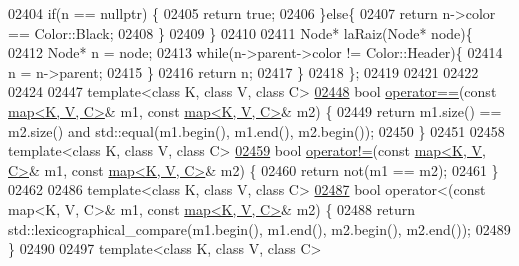 \begin{DoxyCode}
02404         \textcolor{keywordflow}{if}(n == \textcolor{keyword}{nullptr}) \{
02405             \textcolor{keywordflow}{return} \textcolor{keyword}{true};
02406         \}\textcolor{keywordflow}{else}\{
02407             \textcolor{keywordflow}{return} n->color == Color::Black;
02408         \}
02409     \}
02410 
02411     Node* laRaiz(Node* node)\{
02412         Node* n = node;
02413         \textcolor{keywordflow}{while}(n->parent->color != Color::Header)\{
02414             n = n->parent;
02415         \}
02416         \textcolor{keywordflow}{return} n;
02417     \}
02418 \};
02419 
02421 
02422 
02424 
02447 \textcolor{keyword}{template}<\textcolor{keyword}{class} K, \textcolor{keyword}{class} V, \textcolor{keyword}{class} C>
\hypertarget{map0_8h_source.tex_l02448}{}\hyperlink{classaed2_1_1map_abfc51b39670220e79037ac067006e933_abfc51b39670220e79037ac067006e933}{02448} \textcolor{keywordtype}{bool} \hyperlink{classaed2_1_1map_abfc51b39670220e79037ac067006e933_abfc51b39670220e79037ac067006e933}{operator==}(\textcolor{keyword}{const} \hyperlink{classaed2_1_1map}{map<K, V, C>}& m1, \textcolor{keyword}{const} \hyperlink{classaed2_1_1map}{map<K, V, C>}& m2) \{
02449     \textcolor{keywordflow}{return} m1.size() == m2.size() and std::equal(m1.begin(), m1.end(), m2.begin());
02450 \}
02451 
02458 \textcolor{keyword}{template}<\textcolor{keyword}{class} K, \textcolor{keyword}{class} V, \textcolor{keyword}{class} C>
\hypertarget{map0_8h_source.tex_l02459}{}\hyperlink{classaed2_1_1map_abce0fa35c5b25fd67111c2e704616f09_abce0fa35c5b25fd67111c2e704616f09}{02459} \textcolor{keywordtype}{bool} \hyperlink{classaed2_1_1map_abce0fa35c5b25fd67111c2e704616f09_abce0fa35c5b25fd67111c2e704616f09}{operator!=}(\textcolor{keyword}{const} \hyperlink{classaed2_1_1map}{map<K, V, C>}& m1, \textcolor{keyword}{const} \hyperlink{classaed2_1_1map}{map<K, V, C>}& m2) \{
02460     \textcolor{keywordflow}{return} not(m1 == m2);
02461 \}
02462 
02486 \textcolor{keyword}{template}<\textcolor{keyword}{class} K, \textcolor{keyword}{class} V, \textcolor{keyword}{class} C>
\hypertarget{map0_8h_source.tex_l02487}{}\hyperlink{classaed2_1_1map_a8ff07f6a24c290ea7e8f63ec7ab24f8d_a8ff07f6a24c290ea7e8f63ec7ab24f8d}{02487} \textcolor{keywordtype}{bool} operator<(const map<K, V, C>& m1, \textcolor{keyword}{const} \hyperlink{classaed2_1_1map}{map<K, V, C>}& m2) \{
02488         \textcolor{keywordflow}{return} std::lexicographical\_compare(m1.begin(), m1.end(), m2.begin(), m2.end());
02489 \}
02490 
02497 \textcolor{keyword}{template}<\textcolor{keyword}{class} K, \textcolor{keyword}{class} V, \textcolor{keyword}{class} C>

\end{DoxyCode}

